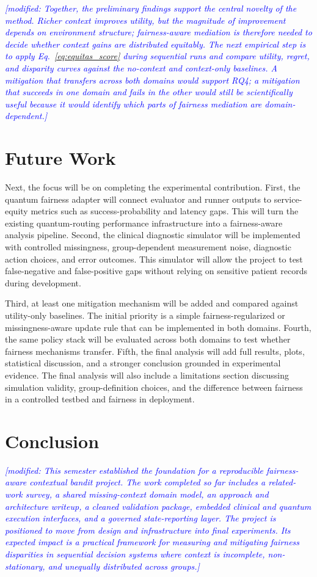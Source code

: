 \documentclass[conference]{IEEEtran}
\newcommand{\modified}[1]{\textcolor{blue}{{\it [modified: #1]}}}
\begin{document}
\modified{Together, the preliminary findings support the central novelty of the method.
Richer context improves utility, but the magnitude of improvement depends on
environment structure; fairness-aware mediation is therefore needed to decide
whether context gains are distributed equitably. The next empirical step is to
apply Eq.~\ref{eq:equitas_score} during sequential runs and compare utility,
regret, and disparity curves against the no-context and context-only
baselines. A mitigation that transfers across both domains would support RQ4;
a mitigation that succeeds in one domain and fails in the other would still be
scientifically useful because it would identify which parts of fairness
mediation are domain-dependent.}

\section{Future Work}
Next, the focus will be on completing the experimental contribution. First,
the quantum fairness adapter will connect evaluator and runner outputs to
service-equity metrics such as success-probability and latency gaps. This will
turn the existing quantum-routing performance infrastructure into a
fairness-aware analysis pipeline. Second, the clinical diagnostic simulator
will be implemented with controlled missingness, group-dependent measurement
noise, diagnostic action choices, and error outcomes. This simulator will allow
the project to test false-negative and false-positive gaps without relying on
sensitive patient records during development.

Third, at least one mitigation mechanism will be added and compared against
utility-only baselines. The initial priority is a simple fairness-regularized
or missingness-aware update rule that can be implemented in both domains.
Fourth, the same policy stack will be evaluated across both domains to test
whether fairness mechanisms transfer. Fifth, the final analysis will add full
results, plots, statistical discussion, and a stronger conclusion grounded in
experimental evidence. The final analysis will also include a limitations
section discussing simulation validity, group-definition choices, and the
difference between fairness in a controlled testbed and fairness in deployment.

\section{Conclusion}
\modified{This semester established the foundation for a reproducible fairness-aware
contextual bandit project. The work completed so far includes a related-work
survey, a shared missing-context domain model, an approach and architecture
writeup, a cleaned validation package, embedded clinical and quantum execution
interfaces, and a governed state-reporting layer. The project is positioned to move from design and infrastructure into final
experiments. Its expected impact is a practical framework for measuring and
mitigating fairness disparities in sequential decision systems where context
is incomplete, non-stationary, and unequally distributed across groups.}
\end{document}
